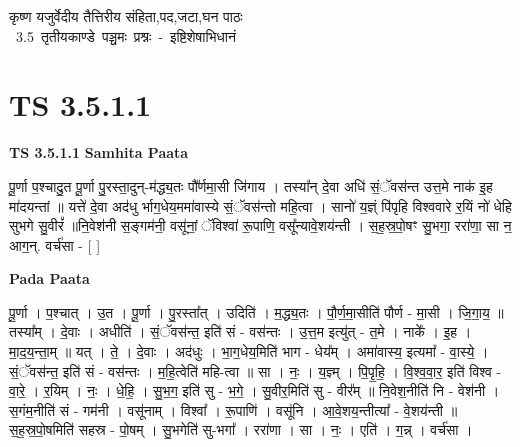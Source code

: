 \documentclass[17pt]{extarticle}
\begin{document}
\begin{titlepage}
    \begin{center}
 
\begin{sanskrit}
    { \Large
    कृष्ण यजुर्वेदीय तैत्तिरीय संहिता,पद,जटा,घन पाठः 
    }
    \\
    \vspace{2.5cm}
    \mbox{ \Large
    3.5      तृतीयकाण्डे पञ्चमः प्रश्नः - इष्टिशेषाभिधानं   }
\end{sanskrit}
\end{center}

\end{titlepage}
\tableofcontents
{}
\pagebreak


\section{ TS 3.5.1.1 }

\textbf{TS 3.5.1.1 } \newline
\textbf{Samhita Paata} \newline

पू॒र्णा प॒श्चादु॒त पू॒र्णा पु॒रस्ता॒दुन्-म॑द्ध्य॒तः पौ᳚र्णमा॒सी जि॑गाय । तस्या᳚न् दे॒वा अधि॑ सं॒ॅवस॑न्त उत्त॒मे नाक॑ इ॒ह मा॑दयन्तां ॥ यत्ते॑ दे॒वा अद॑धु र्भाग॒धेय॒ममा॑वास्ये सं॒ॅवस॑न्तो महि॒त्वा । सानो॑ य॒ज्ञ्ं पि॑पृहि विश्ववारे र॒यिं नो॑ धेहि सुभगे सु॒वीरं᳚ ॥नि॒वेश॑नी स॒ङ्गम॑नी॒ वसू॑नां॒ ॅविश्वा॑ रू॒पाणि॒ वसू᳚न्यावे॒शय॑न्ती । स॒ह॒स्र॒पो॒षꣳ सु॒भगा॒ ररा॑णा॒ सा न॒ आग॒न्. वर्च॑सा - [  ] \newline

\textbf{Pada Paata} \newline

पू॒र्णा । प॒श्चात् । उ॒त । पू॒र्णा । पु॒रस्ता᳚त् । उदिति॑ । म॒द्ध्य॒तः । पौ॒र्ण॒मा॒सीति॑ पौर्ण - मा॒सी । जि॒गा॒य॒ ॥ तस्या᳚म् । दे॒वाः । अधीति॑ । सं॒ॅवस॑न्त॒ इति॑ सं - वस॑न्तः । उ॒त्त॒म इत्यु॑त् - त॒मे । नाके᳚ । इ॒ह । मा॒द॒य॒न्ता॒म् ॥ यत् । ते॒ । दे॒वाः । अद॑धुः । भा॒ग॒धेय॒मिति॑ भाग - धेय᳚म् । अमा॑वास्य॒ इत्यमा᳚ - वा॒स्ये॒ । सं॒ॅवस॑न्त॒ इति॑ सं - वस॑न्तः । म॒हि॒त्वेति॑ महि-त्वा ॥ सा । नः॒ । य॒ज्ञ्म् । पि॒पृ॒हि॒ । वि॒श्व॒वा॒र॒ इति॑ विश्व - वा॒रे॒ । र॒यिम् । नः॒ । धे॒हि॒ । सु॒भ॒ग॒ इति॑ सु - भ॒गे॒ । सु॒वीर॒मिति॑ सु - वीर᳚म् ॥ नि॒वेश॒नीति॑ नि - वेश॑नी । स॒गंम॒नीति॑ सं - गम॑नी । वसू॑नाम् । विश्वा᳚ । रू॒पाणि॑ । वसू॑नि । आ॒वे॒शय॒न्तीत्या᳚ - वे॒शय॑न्ती ॥ स॒ह॒स्र॒पो॒षमिति॑ सहस्र - पो॒षम् । सु॒भगेति॑ सु-भगा᳚ । ररा॑णा । सा । नः॒ । एति॑ । ग॒न्न् । वर्च॑सा ।  \newline
\end{document}
